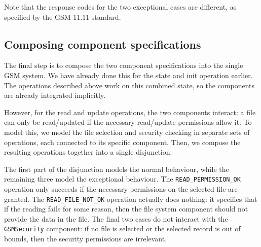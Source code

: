 Note that the response codes for the two exceptional cases are different, as specified by the GSM 11.11 standard.

\subsection{Composing component specifications}

The final step is to compose the two component specifications into the single GSM system. We have already done this for the state and init operation earlier. The operations described above work on this combined state, so the components are already integrated implicitly.

However, for the read and update operations, the two components interact: a file can only be read/updated if the necessary read/update permissions allow it. To model this, we model the file selection and security checking in separate sets of operations, each connected to its specific component. Then, we compose the resulting operations together into a single disjunction:



The first part of the disjunction models the normal behaviour, while the remaining three model the exceptional behaviour. The \texttt{READ\_PERMISSION\_OK} operation only succeeds if the necessary permissions on the selected file are granted. The  \texttt{READ\_FILE\_NOT\_OK} operation actually does nothing: it specifies that if the reading fails for some reason, then the file system component should not provide the data in the file. The final two cases do not interact with the \texttt{GSMSecurity} component: if no file is selected or the selected record is out of bounds, then the security permissions are irrelevant. 

